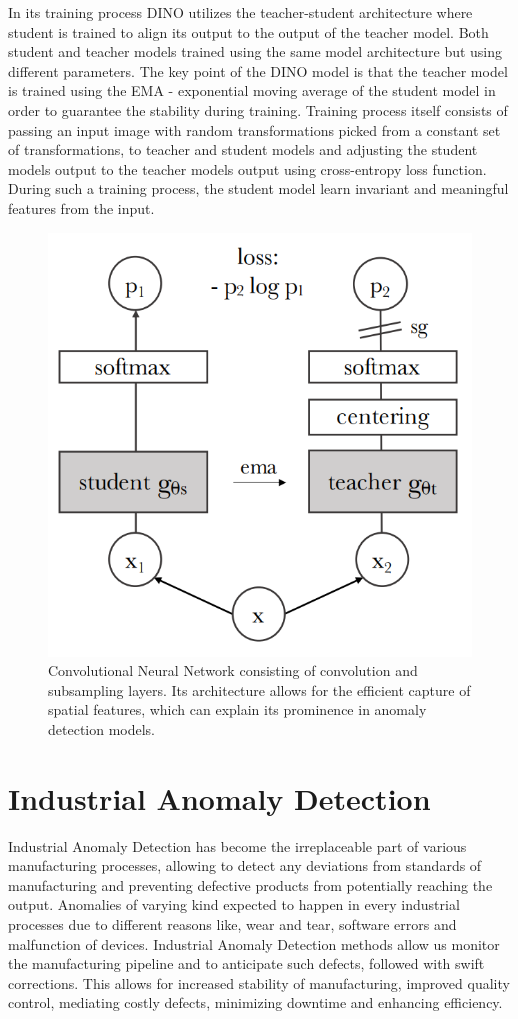 In its training process DINO utilizes the teacher-student architecture where student is trained to align its output to the output of the teacher model. Both student and teacher models trained using the same model architecture but using different parameters. The key point of the DINO model is that the teacher model is trained using the EMA - exponential moving average of the student model in order to guarantee the stability during training. Training process itself consists of passing an input image with random transformations picked from a constant set of transformations, to teacher and student models and adjusting the student models output to the teacher models output using cross-entropy loss function. During such a training process, the student model learn invariant and meaningful features from the input.

\begin{figure}[h]
	\begin{center}
		\includegraphics[width=0.5\linewidth]{Chapter_2/dino.png}
	\end{center}
	\caption{Convolutional Neural Network consisting of convolution and subsampling layers. Its architecture allows for the efficient capture of spatial features, which can explain its prominence in anomaly detection models.}
	\label{fig:cnn}
\end{figure}

\section{Industrial Anomaly Detection}
\label{iad}
Industrial Anomaly Detection has become the irreplaceable part of various manufacturing processes, allowing to detect any deviations from standards of manufacturing and preventing defective products from potentially reaching the output. Anomalies of varying kind expected to happen in every industrial processes due to different reasons like, wear and tear, software errors and malfunction of devices. Industrial Anomaly Detection methods allow us monitor the manufacturing pipeline and to anticipate such defects, followed with swift corrections. This allows for increased stability of manufacturing, improved quality control, mediating costly defects, minimizing downtime and enhancing efficiency.

